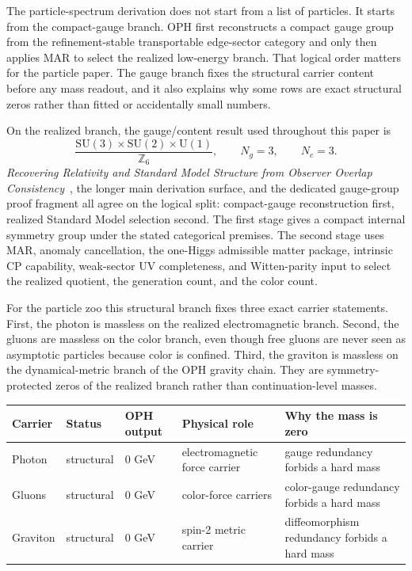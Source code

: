 \documentclass[11pt]{article}
\newcommand{\SU}{\mathrm{SU}}
\newcommand{\U}{\mathrm{U}}
\begin{document}
The particle-spectrum derivation does not start from a list of particles. It starts from the
compact-gauge branch. OPH first reconstructs a compact gauge
group from the refinement-stable transportable edge-sector category and only then applies MAR to
select the realized low-energy branch. That logical order matters for the particle paper. The
gauge branch fixes the structural carrier content before any mass readout, and it also explains
why some rows are exact structural zeros rather than fitted or accidentally small numbers.

On the realized branch, the gauge/content result used throughout this paper is
\[
\frac{\SU(3)\times\SU(2)\times\U(1)}{\mathbb Z_6},
\qquad
N_g=3,
\qquad
N_c=3.
\]
\emph{Recovering Relativity and Standard Model Structure from Observer Overlap Consistency}~\cite{ophcompact}, the longer main derivation surface, and the dedicated gauge-group proof
fragment all agree on the logical split: compact-gauge reconstruction first, realized Standard
Model selection second. The first stage gives a compact internal symmetry group under the stated
categorical premises. The second stage uses MAR, anomaly cancellation, the one-Higgs admissible
matter package, intrinsic CP capability, weak-sector UV completeness, and Witten-parity input to
select the realized quotient, the generation count, and the color count.

For the particle zoo this structural branch fixes three exact carrier statements.
First, the photon is massless on the realized electromagnetic branch. Second, the gluons are
massless on the color branch, even though free gluons are never seen as asymptotic particles
because color is confined. Third, the graviton is massless on the dynamical-metric branch of the
OPH gravity chain. They are symmetry-protected zeros of the realized branch rather than
continuation-level masses.

\begin{table}[h]
\centering
\small
\begin{tabular}{@{}>{\raggedright\arraybackslash}p{}>{\raggedright\arraybackslash}p{}>{\raggedright\arraybackslash}p{}>{\raggedright\arraybackslash}p{}>{\raggedright\arraybackslash}p{}@{}}
\toprule
Carrier & Status & OPH output & Physical role & Why the mass is zero \\
\midrule
Photon & structural & \(0\) GeV & electromagnetic force carrier & gauge redundancy forbids a hard mass \\
Gluons & structural & \(0\) GeV & color-force carriers & color-gauge redundancy forbids a hard mass \\
Graviton & structural & \(0\) GeV & spin-2 metric carrier & diffeomorphism redundancy forbids a hard mass \\
\bottomrule
\end{tabular}
\end{table}
\end{document}
